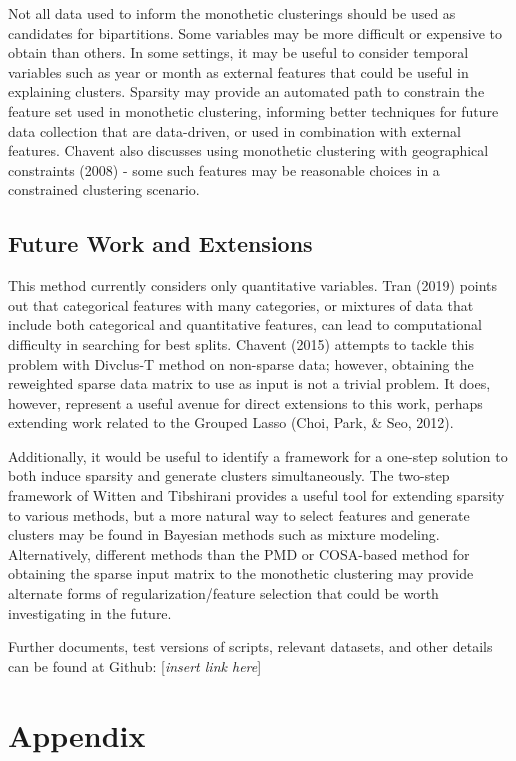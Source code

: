 \documentclass[
]{article}
\begin{document}
Not all data used to inform the monothetic clusterings should be used as
candidates for bipartitions. Some variables may be more difficult or
expensive to obtain than others. In some settings, it may be useful to
consider temporal variables such as year or month as external features
that could be useful in explaining clusters. Sparsity may provide an
automated path to constrain the feature set used in monothetic
clustering, informing better techniques for future data collection that
are data-driven, or used in combination with external features. Chavent
also discusses using monothetic clustering with geographical constraints
(2008) - some such features may be reasonable choices in a constrained
clustering scenario.

\hypertarget{future-work-and-extensions}{%
\subsection{Future Work and
Extensions}\label{future-work-and-extensions}}

This method currently considers only quantitative variables. Tran (2019)
points out that categorical features with many categories, or mixtures
of data that include both categorical and quantitative features, can
lead to computational difficulty in searching for best splits. Chavent
(2015) attempts to tackle this problem with Divclus-T method on
non-sparse data; however, obtaining the reweighted sparse data matrix to
use as input is not a trivial problem. It does, however, represent a
useful avenue for direct extensions to this work, perhaps extending work
related to the Grouped Lasso (Choi, Park, \& Seo, 2012).

Additionally, it would be useful to identify a framework for a one-step
solution to both induce sparsity and generate clusters simultaneously.
The two-step framework of Witten and Tibshirani provides a useful tool
for extending sparsity to various methods, but a more natural way to
select features and generate clusters may be found in Bayesian methods
such as mixture modeling. Alternatively, different methods than the PMD
or COSA-based method for obtaining the sparse input matrix to the
monothetic clustering may provide alternate forms of
regularization/feature selection that could be worth investigating in
the future.

Further documents, test versions of scripts, relevant datasets, and
other details can be found at Github: {[}\emph{insert link here}{]}

\hypertarget{appendix}{%
\section{Appendix}\label{appendix}}
\end{document}
